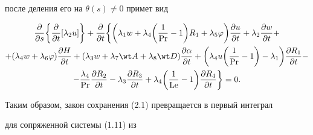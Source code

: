 после деления его на $\theta(s)\ne0$ примет вид 


\begin{multline*} 


\frac{\partial}{\partial s}\bigg\{ 


\frac{\partial}{\partial t}[\lambda_2u]\bigg\}+ 


\frac{\partial}{\partial t}\bigg\{\bigg(\lambda_1w+\lambda_4 


\bigg(\frac{1}{\PR}-1\bigg)R_1+\lambda_5\varphi\bigg) 


\frac{\partial u}{\partial t}+\lambda_2 


\frac{\partial w}{\partial t}+ \\ 


% 


+(\lambda_4w+\lambda_6\varphi) 


\frac{\partial H}{\partial t}+(\lambda_3w+\lambda_7\wt A+ 


\lambda_8\wt D)\frac{\partial\alpha}{\partial t}+ 


\bigg(\lambda_4u\bigg(\frac{1}{\PR}-1\bigg)- 


\lambda_1\bigg)\frac{\partial R_1}{\partial t}- \\ 


% 


-\frac{\lambda_4}{\PR}\frac{\partial R_2}{\partial t}- 


\lambda_3\frac{\partial R_3}{\partial t}+\lambda_4\bigg( 


\frac{1}{\Le}-1\bigg) 


\frac{\partial R_4}{\partial t}\bigg\}=0. 


\end{multline*} 


Таким образом, закон сохранения (2.1) превращается в первый интеграл 


для сопряженной системы (1.11) из \cite{2} 


